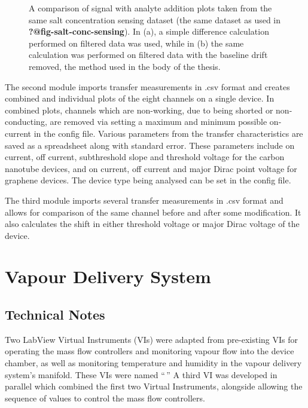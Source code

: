 \documentclass[
  a4paper,
]{scrbook}
\begin{document}
\begin{figure}
\begin{minipage}[t]{0.50\linewidth}
{{}

}

\subcaption{\label{fig-spaa-detrend}}
\end{minipage}%

\caption{\label{fig-spaa-plot-comparison}A comparison of signal with
analyte addition plots taken from the same salt concentration sensing
dataset (the same dataset as used in \textbf{?@fig-salt-conc-sensing}).
In (a), a simple difference calculation performed on filtered data was
used, while in (b) the same calculation was performed on filtered data
with the baseline drift removed, the method used in the body of the
thesis.}

\end{figure}

The second module imports transfer measurements in .csv format and
creates combined and individual plots of the eight channels on a single
device. In combined plots, channels which are non-working, due to being
shorted or non-conducting, are removed via setting a maximum and minimum
possible on-current in the config file. Various parameters from the
transfer characteristics are saved as a spreadsheet along with standard
error. These parameters include on current, off current, subthreshold
slope and threshold voltage for the carbon nanotube devices, and on
current, off current and major Dirac point voltage for graphene devices.
The device type being analysed can be set in the config file.

The third module imports several transfer measurements in .csv format
and allows for comparison of the same channel before and after some
modification. It also calculates the shift in either threshold voltage
or major Dirac voltage of the device.

\hypertarget{vapour-delivery-system}{%
\chapter{Vapour Delivery System}\label{vapour-delivery-system}}

\hypertarget{technical-notes}{%
\section{Technical Notes}\label{technical-notes}}

Two LabView Virtual Instruments (VIs) were adapted from pre-existing VIs
for operating the mass flow controllers and monitoring vapour flow into
the device chamber, as well as monitoring temperature and humidity in
the vapour delivery system's manifold. These VIs were named ``\,'' A
third VI was developed in parallel which combined the first two Virtual
Instruments, alongside allowing the sequence of values to control the
mass flow controllers.
\end{document}
